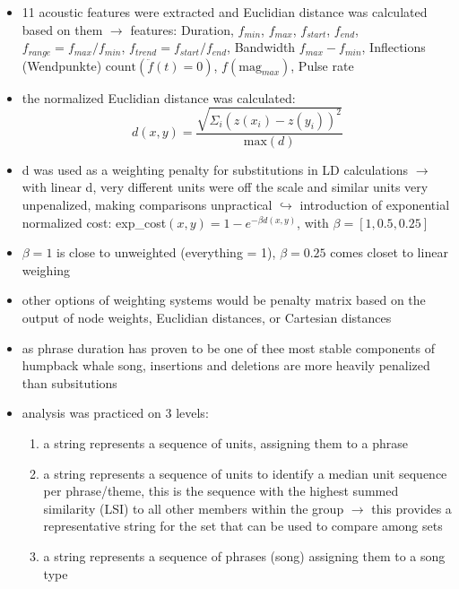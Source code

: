 \documentclass[12pt,a4paper]{article}
\begin{document}
\begin{itemize}
   \item 11 acoustic features were extracted and Euclidian distance was calculated based on them
   \newline \indent $\longrightarrow$ features: Duration, $f_{min}$, $f_{max}$, $f_{start}$, $f_{end}$, $f_{range} = f_{max}/f_{min}$, $f_{trend} = f_{start} / f_{end}$, Bandwidth $f_{max} - f_{min}$, Inflections (Wendpunkte) $\text{count}(\ddot f(t) =0)$, $f(\text{mag}_{max})$, Pulse rate
   \item the normalized Euclidian distance was calculated:
   \begin{equation}
     d(x, y) = \frac{\sqrt{\Sigma_i (z(x_i) - z(y_i))^2}}{\mathrm{max}(d)}
   \end{equation}
   \item d was used as a weighting penalty for substitutions in LD calculations
   \newline \indent $\longrightarrow$ with linear d, very different units were off the scale and similar units very unpenalized, making comparisons unpractical
   \newline \indent $\hookrightarrow$ introduction of exponential normalized cost: exp\_cost$(x, y) = 1- e^{- \beta d(x, y)}$, with $\beta = [1, 0.5, 0.25]$
   \item $\beta = 1$ is close to unweighted (everything = 1),  $\beta = 0.25$ comes closet to linear weighing
   \item other options of weighting systems would be penalty matrix based on the output of node weights, Euclidian distances, or Cartesian distances
   \item as phrase duration has proven to be one of thee most stable components of humpback whale song, insertions and deletions are more heavily penalized than subsitutions
   \item analysis was practiced on 3 levels:
   \begin{enumerate}[A]
     \item a string represents a sequence of units, assigning them to a phrase
     \item a string represents a sequence of units to identify a median unit sequence per phrase/theme, this is the sequence with the highest summed similarity (LSI) to all other members within the group
     \newline \indent $\longrightarrow$ this provides a representative string for the set that can be used to compare among sets
     \item a string represents a sequence of phrases (song) assigning them to a song type

\end{enumerate}
\end{itemize}
\end{document}

